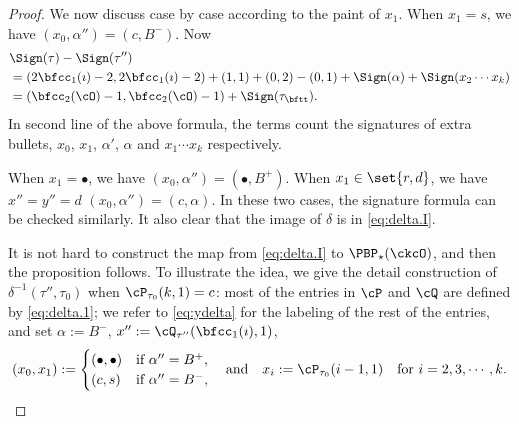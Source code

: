 \documentclass[ssunip]{subfiles}
\begin{document}
\begin{proof}
We now discuss case by case according to the paint of $x_{1}$.
When $x_{1} = s$, we have $(x_{0}, \alpha'') = (c,B^{-})$.
Now %
\begin{equation}\label{eq:sign.GD2}
  \begin{split}
    & \Sign(\tau) - \Sign(\tau'') \\
    &= (2\bfcc_{1}(\imath)-2,2\bfcc_{1}(\imath)-2)
    + (1,1) + (0,2) - (0,1) + \Sign(\alpha) + \Sign(x_{2}\cdots x_{k})\\
    & = (\bfcc_{2}(\cO)-1, \bfcc_{2}(\cO)-1)+ \Sign(\tau_{\bftt}).
  \end{split}
\end{equation}
In second line of the above formula, the terms count the signatures of extra
bullets, $x_{0}$, $x_{1}$, $\alpha'$, $\alpha$ and $x_{1}\cdots x_{k}$ respectively.

When $x_{1} = \bullet$, we have $(x_{0}, \alpha'') = (\bullet,B^{+})$.
When $x_{1} \in \set{r,d}$, we have $x'' = y''= d$ $(x_{0}, \alpha'') = (c,\alpha)$.
In these two cases, the signature formula can be checked similarly.%
It also clear that the image of $\delta$ is in \eqref{eq:delta.I}.

It is not hard to construct the map from \eqref{eq:delta.I} to
$\PBP_{\star}(\ckcO)$, and then the proposition follows. To illustrate the idea,
we give the detail construction of $\delta^{-1}(\tau'',\tau_{0})$
when $\cP_{\tau_{0}}(k,1)=c$: most of the entries in $\cP$ and $\cQ$ are defined
by \eqref{eq:delta.1}; we refer to \eqref{eq:ydelta} for the labeling of the
rest of the entries, and set $\alpha:=B^{-}$, $x'':= \cQ_{\tau''}(\bfcc_{1}(\imath),1)$,
\[
(x_{0},x_{1}) := \begin{cases}
  (\bullet,\bullet) & \text{if } \alpha''= B^{+},\\
  (c,s) & \text{if } \alpha''= B^{-},
\end{cases}
\quad \text{and}\quad
x_{i} := \cP_{\tau_{0}}(i-1,1) \quad \text{for } i = 2,3,\cdots,k.
\]




\end{proof}
\end{document}

